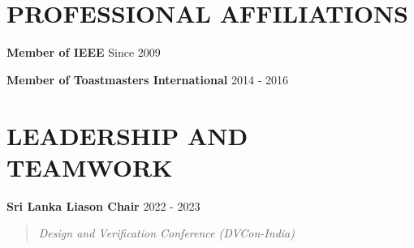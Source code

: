 \documentclass[mm]{res} %
\begin{document}
\begin{resume}



\vspace{2 mm}
\section{PROFESSIONAL AFFILIATIONS} 

\textbf{Member of IEEE} \hfill Since 2009 


\textbf{Member of Toastmasters International} \hfill 2014 - 2016

\vspace{2 mm}
\section{LEADERSHIP AND TEAMWORK} 

\textbf{Sri Lanka Liason Chair} \hfill 2022 - 2023 
\begin{quote}
	\emph{Design and Verification Conference (DVCon-India)}
\end{quote}


\end{resume}
\end{document}
